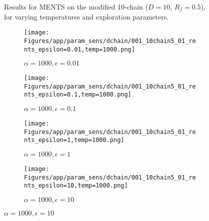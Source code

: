 \documentclass{article}
\theoremstyle{plain}
\begin{document}
\begin{appendices}
\begin{figure}
                \caption{Results for MENTS on the modified 10-chain ($D=10$, $R_f=0.5$), for varying temperatures and exploration parameters.}
                \label{fig:ments_10chain_half_hps}
            \end{figure}


            \begin{figure}
                \centering
                
                \begin{subfigure}[b]{0.24\textwidth}
                    \centering
                    \texttt{[image: Figures/app/param\_sens/dchain/001\_10chain5\_01\_rents\_epsilon=0.01,temp=1000.png]}
                    \caption*{$\alpha=1000,\epsilon=0.01$}
                \end{subfigure}
                \begin{subfigure}[b]{0.24\textwidth}
                    \centering
                    \texttt{[image: Figures/app/param\_sens/dchain/001\_10chain5\_01\_rents\_epsilon=0.1,temp=1000.png]}
                    \caption*{$\alpha=1000,\epsilon=0.1$}
                \end{subfigure}
                \begin{subfigure}[b]{0.24\textwidth}
                    \centering
                    \texttt{[image: Figures/app/param\_sens/dchain/001\_10chain5\_01\_rents\_epsilon=1,temp=1000.png]}
                    \caption*{$\alpha=1000,\epsilon=1$}
                \end{subfigure}
                \begin{subfigure}[b]{0.24\textwidth}
                    \centering
                    \texttt{[image: Figures/app/param\_sens/dchain/001\_10chain5\_01\_rents\_epsilon=10,temp=1000.png]}
                    \caption*{$\alpha=1000,\epsilon=10$}
                \end{subfigure}
                

\end{figure}
\end{appendices}
\end{document}

